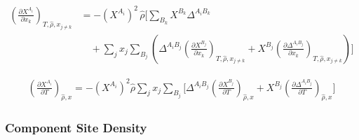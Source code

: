 \documentclass[12pt, letterpaper]{article}
\begin{document}

\begin{equation}
    \begin{aligned}
        \left(\frac{\partial X^{A_{i}}}{\partial x_{k}}\right)_{T,\hat{\rho},x_{j\neq k}}
        &=
        -(X^{A_{i}})^{2}\,\hat{\rho}
        \Bigg[
        \sum_{B_{k}}X^{B_{k}}\Delta^{A_{i}B_{k}}
        \\
        &\quad +
        \sum_{j}x_{j}\sum_{B_{j}}
        \left(
        \Delta^{A_{i}B_{j}}\left(\frac{\partial X^{B_{j}}}{\partial x_{k}}\right)_{T,\hat{\rho},x_{j\neq k}}
        +
        X^{B_{j}}\left(\frac{\partial \Delta^{A_{i}B_{j}}}{\partial x_{k}}\right)_{T,\hat{\rho},x_{j\neq k}}
        \right)
        \Bigg]
    \end{aligned}
    \label{eq:dx_assoc_dxk}
\end{equation}


\begin{equation}
    \begin{aligned}
        \left(\frac{\partial X^{A_i}}{\partial T}\right)_{\hat{\rho},x}
        =-(X^{A_i})^2\hat{\rho}
        \sum_j x_j\sum_{B_j}
        \Bigg[
        \Delta^{A_iB_j}
        \left(\frac{\partial X^{B_j}}{\partial T}\right)_{\hat{\rho},x}
        +X^{B_j}
        \left(\frac{\partial\Delta^{A_iB_j}}{\partial T}\right)_{\hat{\rho},x}
        \Bigg]
    \end{aligned}
    \label{eq:dx_assoc_dT}
\end{equation}

\subsubsection{Component Site Density}
\end{document}
